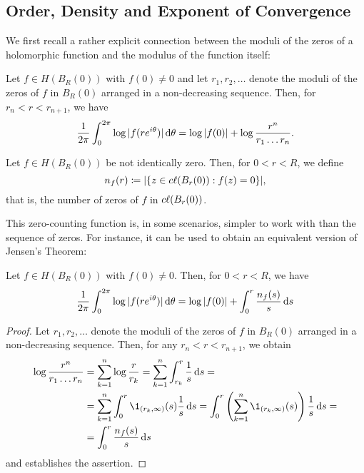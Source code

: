 \subsection{Order, Density and Exponent of Convergence}

We first recall a rather explicit connection between the moduli of the zeros of a holomorphic function and the modulus of the function itself:

\begin{theorem}[Jensen] \label{thm:jensen}
    Let $f \in H(B_R(0))$ with $f(0) \neq 0$ and let $r_1, r_2, \hdots$ denote the moduli of the zeros of $f$ in $B_{R}(0)$ arranged in a non-decreasing sequence. Then, for $r_n < r < r_{n+1}$, we have
    \begin{equation}
        \frac{1}{2 \pi} \int_0^{2\pi} \log \vert f(r e^{i \theta}) \vert \mathop{}\!\mathrm{d} \theta = \log \vert f(0) \vert + \log \frac{r^n}{r_1 \hdots r_n}.
    \end{equation}
\end{theorem}

\begin{definition}
    Let $f \in H(B_R(0))$ be not identically zero. Then, for $0 < r < R$, we define
    \begin{equation}
        n_f(r) \coloneqq \vert \{ z \in c\ell({B_r(0)}) : f(z) = 0 \} \vert,
    \end{equation}
    that is, the number of zeros of $f$ in $c\ell({B_{r}(0)})$.
\end{definition}

This zero-counting function is, in some scenarios, simpler to work with than the sequence of zeros. For instance, it can be used to obtain an equivalent version of Jensen's Theorem:

\begin{corollary} \label{cor:jensen-nf}
    Let $f \in H(B_R(0))$ with $f(0) \neq 0$. Then, for $0 < r < R$, we have
    \begin{equation}
        \frac{1}{2 \pi} \int_0^{2\pi} \log \vert f(re^{i \theta}) \vert \mathop{}\!\mathrm{d} \theta = \log \vert f(0) \vert + \int_0^r \frac{n_f(s)}{s} \mathop{}\!\mathrm{d} s
    \end{equation}
\end{corollary}

\begin{proof}
    Let $r_1, r_2, \hdots$ denote the moduli of the zeros of $f$ in $B_{R}(0)$ arranged in a non-decreasing sequence. Then, for any $r_n < r < r_{n+1}$, we obtain
    \begin{align*}
        \log \frac{r^n}{r_1 \hdots r_n} &= \sum_{k=1}^n \log \frac{r}{r_k} = \sum_{k=1}^n \int_{r_k}^r \frac{1}{s} \diff s = \\
        &= \sum_{k=1}^n \int_0^r \1_{(r_k, \infty)}(s) \frac{1}{s} \diff s = \int_0^r \left( \sum_{k=1}^n \1_{(r_k, \infty)}(s) \right) \frac{1}{s} \diff s = \\
        &= \int_0^r \frac{n_f(s)}{s} \diff s
    \end{align*}
    and  establishes the assertion.
\end{proof}

